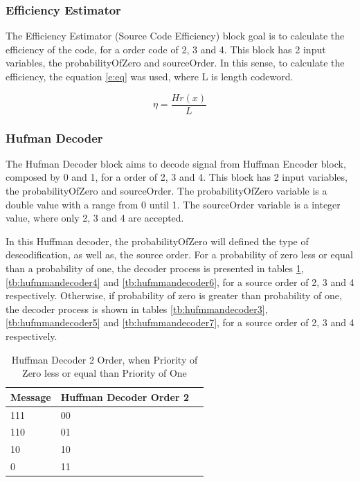 \begin{refsection}
\subsubsection{Efficiency Estimator}
The Efficiency Estimator (Source Code Efficiency) block goal is to calculate the efficiency of the code, for a order code of 2, 3 and 4. This block has 2 input variables, the probabilityOfZero and sourceOrder.
In this sense, to calculate the efficiency, the equation \ref{e:eq} was used, where L is length codeword.

\begin{equation}
\eta=\frac{Hr(x)}{L}
 \label{e:eq}
\end{equation}

\subsubsection{Hufman Decoder}


The Hufman Decoder block aims to decode signal from Huffman Encoder block, composed by 0 and 1, for a order of 2, 3 and 4. This block has 2 input variables, the probabilityOfZero and sourceOrder. 
The probabilityOfZero variable is a double value with a range from 0 until 1. The sourceOrder variable is a integer value, where only 2, 3 and 4 are accepted.

In this Huffman decoder, the probabilityOfZero will defined the type of descodification, as well as, the source order. For a probability of zero less or equal than a probability of one, the decoder process is presented in tables \ref{tb:hufmmandecoder2}, \ref{tb:hufmmandecoder4} and \ref{tb:hufmmandecoder6}, for a source order of 2, 3 and 4 respectively.
Otherwise, if probability of zero is greater than probability of one, the decoder process is shown in tables \ref{tb:hufmmandecoder3}, \ref{tb:hufmmandecoder5} and \ref{tb:hufmmandecoder7}, for a source order of 2, 3 and 4 respectively.


\begin{table}[H]
\centering
\caption{Huffman Decoder 2 Order, when Priority of Zero less or equal than Priority of One}
\label{tb:hufmmandecoder2}
\begin{tabular}{|l|l|l|}
\hline
\textbf{Message}                      & \textbf{Huffman Decoder Order 2}                                       \\ \hline
111              & 00                                               \\ \hline
110              & 01                                           \\ \hline
10                & 10                                      \\ \hline
0                  & 11                                  \\ \hline


\end{tabular}
\end{table}
\end{refsection}
